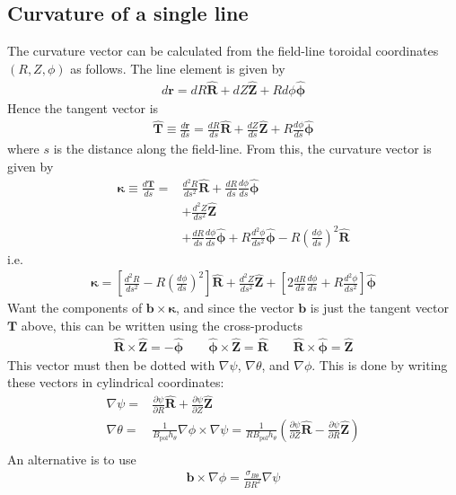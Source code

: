 \documentclass[12pt]{article}
\newcommand{\sbt}{\ensuremath{\sigma_{B\theta}}}
\newcommand{\dd}[2]{\ensuremath{\frac{d #1}{d #2}}}
\newcommand{\ddd}[2]{\ensuremath{\frac{d^2 #1}{d #2^2}}}
\newcommand{\deriv}[2]{\ensuremath{\frac{\partial #1}{\partial #2}}}
\newcommand{\hthe}{\ensuremath{h_\theta}}
\newcommand{\Bp}{\ensuremath{B_{\text{pol}}}}
\newcommand{\ve}[1]{\ensuremath{\boldsymbol{#1}}}
\newcommand{\hv}[1]{\hat{\ve{#1}}}
\newcommand{\bvec}{\ve{b}}
\newcommand{\kvec}{\ve{\kappa}}
\newcommand{\Rvec}{\ensuremath{\hv{R}}}
\newcommand{\Zvec}{\ensuremath{\hv{Z}}}
\newcommand{\phivec}{\ensuremath{\hv{\phi}}}
\begin{document}
\subsection{Curvature of a single line}
The curvature vector can be calculated from the field-line toroidal
coordinates $\left(R,Z,\phi\right)$ as follows. The line element
is given by
%
\begin{align*}
d\ve{r} = dR\Rvec + dZ\Zvec + Rd\phi\phivec
\end{align*}
%
Hence the tangent vector is
%
\begin{align*}
\hv{T} \equiv \dd{\ve{r}}{s} = \dd{R}{s}\Rvec + \dd{Z}{s}\Zvec +
R\dd{\phi}{s}\phivec
\end{align*}
%
where $s$ is the distance along the field-line. From this, the curvature vector
is given by
%
\begin{align*}
\kvec \equiv \dd{\ve{T}}{s} =& \ddd{R}{s}\Rvec + \dd{R}{s}\dd{\phi}{s}\phivec
\\
&+ \ddd{Z}{s}\Zvec \\
&+ \dd{R}{s}\dd{\phi}{s}\phivec + R\ddd{\phi}{s}\phivec -
R\left(\dd{\phi}{s}\right)^2 \Rvec
\end{align*}
%
i.e.
%
\begin{align}
\kvec = \left[\ddd{R}{s} - R\left(\dd{\phi}{s}\right)^2\right]\Rvec +
\ddd{Z}{s}\Zvec + \left[2\dd{R}{s}\dd{\phi}{s} + R\ddd{\phi}{s}\right]\phivec
\label{eq:kappaline}
\end{align}
%
Want the components of $\ve{b}\times\kvec$, and since the vector $\ve{b}$
is just the tangent vector $\ve{T}$ above, this can be written using the
cross-products
%
\begin{align*}
\Rvec\times\Zvec = -\phivec \qquad \phivec\times\Zvec = \Rvec \qquad
\Rvec\times\phivec = \Zvec
\end{align*}
%
This vector must then be dotted with $\nabla\psi$, $\nabla\theta$, and
$\nabla\phi$. This is done by writing these vectors in cylindrical coordinates:
%
\begin{align*}
\nabla\psi =& \deriv{\psi}{R}\hv{R} + \deriv{\psi}{Z}\hv{Z} \\
\nabla\theta =& \frac{1}{\Bp\hthe}\nabla\phi\times\nabla\psi =
\frac{1}{R\Bp\hthe}\left(\deriv{\psi}{Z}\hv{R} -
\deriv{\psi}{R}\hv{Z}\right) \\
\end{align*}
%
An alternative is to use
%
\begin{align*}
\bvec \times \nabla\phi = \frac{\sbt}{BR^2}\nabla\psi
\end{align*}
\end{document}
